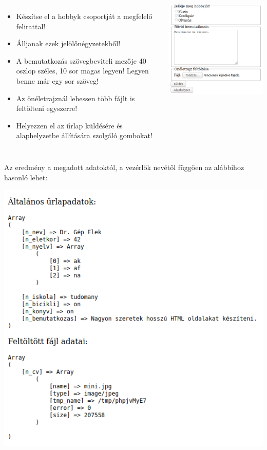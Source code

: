 \begin{frame}
  \begin{columns}[c]
      \begin{itemize}
        \item Készítse el a hobbyk csoportját a megfelelő felirattal!
        \item Álljanak ezek jelölőnégyzetekből!
        \item A bemutatkozás szövegbeviteli mezője 40 oszlop széles, 10 sor magas legyen! Legyen benne már egy sor szöveg!
        \item Az önéletrajznál lehessen több fájlt is feltölteni egyszerre!
        \item Helyezzen el az űrlap küldésére és alaphelyzetbe állítására szolgáló gombokat!
      \end{itemize}
      \begin{exampleblock}{}
        \includegraphics[width=\textwidth]{urlap-2.png}
      \end{exampleblock}
  \end{columns}
\end{frame}

\begin{frame}
  Az eredmény a megadott adatoktól, a vezérlők nevétől függően az alábbihoz hasonló lehet:
  \begin{center}
    \includegraphics[width=.4\textwidth]{urlap-3.png}
  \end{center}
\end{frame}
